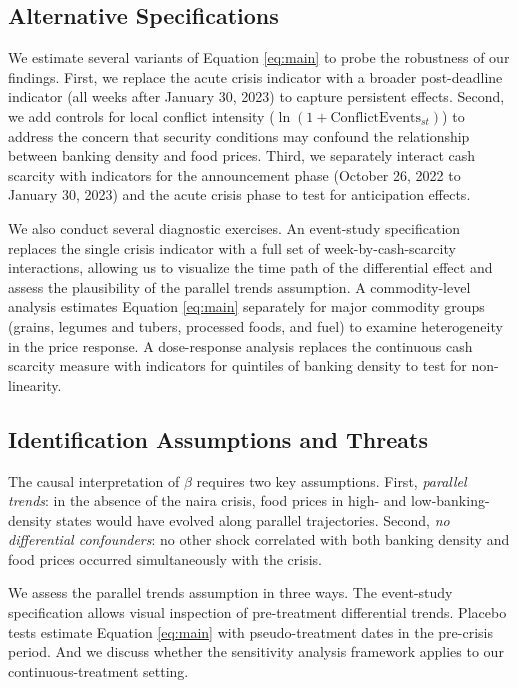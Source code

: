 \documentclass[12pt]{article}
\begin{document}
\subsection{Alternative Specifications}

We estimate several variants of Equation \ref{eq:main} to probe the robustness of our findings. First, we replace the acute crisis indicator with a broader post-deadline indicator (all weeks after January 30, 2023) to capture persistent effects. Second, we add controls for local conflict intensity ($\ln(1 + \text{ConflictEvents}_{st})$) to address the concern that security conditions may confound the relationship between banking density and food prices. Third, we separately interact cash scarcity with indicators for the announcement phase (October 26, 2022 to January 30, 2023) and the acute crisis phase to test for anticipation effects.

We also conduct several diagnostic exercises. An event-study specification replaces the single crisis indicator with a full set of week-by-cash-scarcity interactions, allowing us to visualize the time path of the differential effect and assess the plausibility of the parallel trends assumption. A commodity-level analysis estimates Equation \ref{eq:main} separately for major commodity groups (grains, legumes and tubers, processed foods, and fuel) to examine heterogeneity in the price response. A dose-response analysis replaces the continuous cash scarcity measure with indicators for quintiles of banking density to test for non-linearity.

\subsection{Identification Assumptions and Threats}

The causal interpretation of $\beta$ requires two key assumptions. First, \textit{parallel trends}: in the absence of the naira crisis, food prices in high- and low-banking-density states would have evolved along parallel trajectories. Second, \textit{no differential confounders}: no other shock correlated with both banking density and food prices occurred simultaneously with the crisis.

We assess the parallel trends assumption in three ways. The event-study specification allows visual inspection of pre-treatment differential trends. Placebo tests estimate Equation \ref{eq:main} with pseudo-treatment dates in the pre-crisis period. And we discuss whether the \citet{rambachan2023more} sensitivity analysis framework applies to our continuous-treatment setting.
\end{document}
